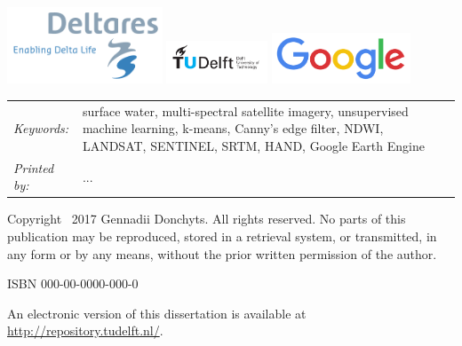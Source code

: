 \begin{titlepage}
\vfill

\begin{center}
    \includegraphics[height=0.9in]{00.1-title/logos/deltares}
    \hspace{3em} \vspace{3em} 
    \includegraphics[height=0.5in]{00.1-title/logos/tudelft}
    \hspace{3em} 
    \includegraphics[height=0.6in]{00.1-title/logos/google} 
\end{center}
\vfill

\noindent
\begin{tabular}{@{}p{}@{}p{}}
    \textit{Keywords:} & {surface water, multi-spectral satellite imagery, unsupervised machine learning, k-means, Canny's edge filter, NDWI, LANDSAT, SENTINEL, SRTM, HAND, Google Earth Engine} \\[\medskipamount]
    \textit{Printed by:} & ... \\[\medskipamount]
\end{tabular}

\vspace{4\bigskipamount}

\noindent Copyright \textcopyright\ 2017 Gennadii Donchyts. All rights reserved. No parts of this publication may be reproduced, stored in a retrieval system, or transmitted, in any form or by any means, without the prior written permission of the author.

\medskip
\noindent ISBN 000-00-0000-000-0

\medskip
\noindent An electronic version of this dissertation is available at \\
\url{http://repository.tudelft.nl/}.

\end{titlepage}

